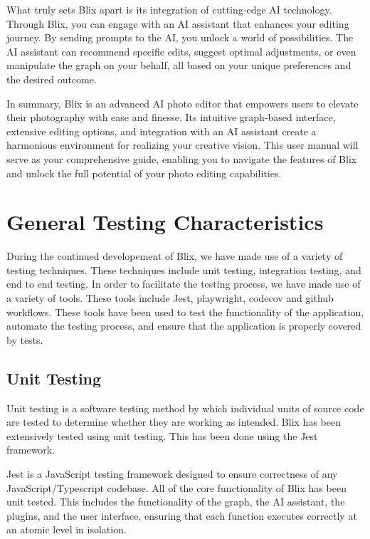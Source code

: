 \documentclass[11pt,a4paper]{article}
\begin{document}
What truly sets Blix apart is its integration of cutting-edge AI technology.
Through Blix, you can engage with an AI assistant that enhances your editing
journey. By sending prompts to the AI, you unlock a world of possibilities. The
AI assistant can recommend specific edits, suggest optimal adjustments, or even
manipulate the graph on your behalf, all based on your unique preferences and
the desired outcome.

In summary, Blix is an advanced AI photo editor that empowers users to elevate
their photography with ease and finesse. Its intuitive graph-based interface,
extensive editing options, and integration with an AI assistant create a
harmonious environment for realizing your creative vision. This user manual will
serve as your comprehensive guide, enabling you to navigate the features of Blix
and unlock the full potential of your photo editing capabilities.

\pagebreak


\section*{General Testing Characteristics}   

During the continued developement of Blix, we have made use of a variety of
testing techniques. These techniques include unit testing, integration testing,
and end to end testing. In order to facilitate the testing process, we have made
use of a variety of tools. These tools include Jest, playwright, codecov and
github workflows. These tools have been used to test the functionality of the
application, automate the testing process, and ensure that the application is
properly covered by tests.


\subsection*{Unit Testing}

Unit testing is a software testing method by which individual units of source
code are tested to determine whether they are working as intended. Blix has been
extensively tested using unit testing. This has been done using the Jest
framework. 

Jest is a JavaScript testing framework designed to ensure correctness of any
JavaScript/Typescript codebase. All of the core functionality of Blix has been
unit tested. This includes the functionality of the graph, the AI assistant, the
plugins, and the user interface, ensuring that each function executes correctly
at an atomic level in isolation. 
\end{document}
